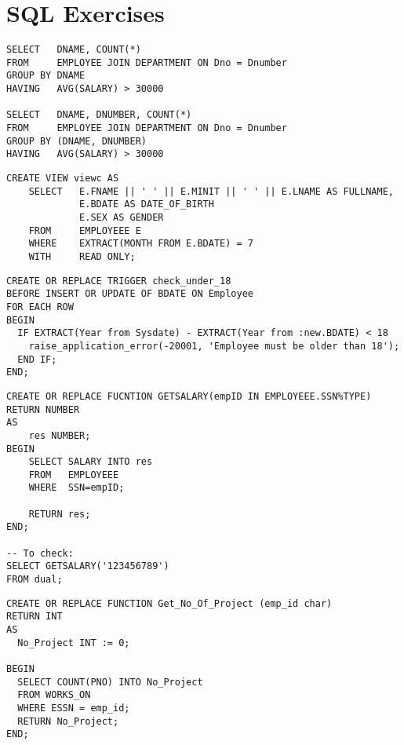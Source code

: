 \chapter{SQL Exercises}


\begin{verbatim}
SELECT   DNAME, COUNT(*)
FROM     EMPLOYEE JOIN DEPARTMENT ON Dno = Dnumber
GROUP BY DNAME
HAVING   AVG(SALARY) > 30000

SELECT   DNAME, DNUMBER, COUNT(*)
FROM     EMPLOYEE JOIN DEPARTMENT ON Dno = Dnumber
GROUP BY (DNAME, DNUMBER)
HAVING   AVG(SALARY) > 30000
\end{verbatim}


\begin{verbatim}
CREATE VIEW viewc AS
    SELECT   E.FNAME || ' ' || E.MINIT || ' ' || E.LNAME AS FULLNAME,
             E.BDATE AS DATE_OF_BIRTH
             E.SEX AS GENDER
    FROM     EMPLOYEEE E
    WHERE    EXTRACT(MONTH FROM E.BDATE) = 7
    WITH     READ ONLY;
\end{verbatim}


\begin{verbatim}
CREATE OR REPLACE TRIGGER check_under_18
BEFORE INSERT OR UPDATE OF BDATE ON Employee
FOR EACH ROW
BEGIN
  IF EXTRACT(Year from Sysdate) - EXTRACT(Year from :new.BDATE) < 18
    raise_application_error(-20001, 'Employee must be older than 18');
  END IF;
END;
\end{verbatim}



\begin{verbatim}
CREATE OR REPLACE FUCNTION GETSALARY(empID IN EMPLOYEEE.SSN%TYPE)
RETURN NUMBER
AS
    res NUMBER;
BEGIN
    SELECT SALARY INTO res
    FROM   EMPLOYEEE
    WHERE  SSN=empID;

    RETURN res;
END;

-- To check:
SELECT GETSALARY('123456789')
FROM dual;
\end{verbatim}

\begin{verbatim}
CREATE OR REPLACE FUNCTION Get_No_Of_Project (emp_id char)
RETURN INT
AS
  No_Project INT := 0;

BEGIN
  SELECT COUNT(PNO) INTO No_Project
  FROM WORKS_ON
  WHERE ESSN = emp_id;
  RETURN No_Project;
END;
\end{verbatim}


